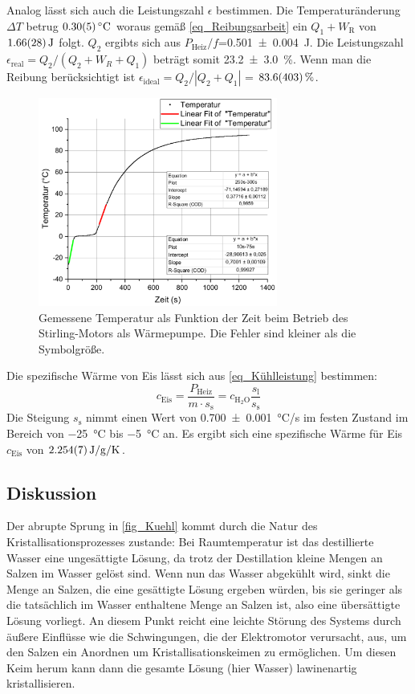 \documentclass[
	a4paper,
	12pt,
	pagesize,
	ngerman
]{scrartcl}
\begin{document}
	Analog lässt sich auch die Leistungszahl $\epsilon$ bestimmen. 
	Die Temperaturänderung $\Delta{T}$ betrug $\SI{0,3+-0,05}{\degreeCelsius}$ woraus gemäß \cref{eq_Reibungsarbeit} ein $Q_1+W_\text{R}$ von $\SI{1,66+-0,28}{J}$ folgt. 
	$Q_2$ ergibts sich aus $P_\text{Heiz}/f$=\SI{0,501+-0,004}{J}.
	Die Leistungszahl $\epsilon_\text{real}=Q_2/(Q_2+W_R+Q_1)$ beträgt somit \SI{23,2+-3,0}{\%}.
	Wenn man die Reibung berücksichtigt ist $\epsilon_\text{ideal}=Q_2/|Q_2+Q_1|$ = $\SI{83,6+-40,3}{\%}$.
	\begin{figure}[H]
		\includegraphics[width=0.7\textwidth]{Waerm}
		\centering
		\caption{Gemessene Temperatur als Funktion der Zeit beim Betrieb des Stirling-Motors als Wärmepumpe. Die Fehler sind kleiner als die Symbolgröße.}
		\label{fig_Waerm}
		\centering
	\end{figure}

	Die spezifische Wärme von Eis lässt sich aus \cref{eq_Kühlleistung} bestimmen:
	\begin{equation}
		c_\text{Eis} = \frac{P_\text{Heiz}}{m \cdot s_\text{s}} = c_{\text{H}_2\text{O}} \frac{s_\text{l}}{s_\text{s}}
	\end{equation} 
	Die Steigung $s_\text{s}$ nimmt einen Wert von \SI{0,700+-0,001}{\degreeCelsius/s} im festen Zustand im Bereich von \SI{-25}{\degreeCelsius} bis \SI{-5}{\degreeCelsius} an.
	Es ergibt sich eine spezifische Wärme für Eis $c_\text{Eis}$ von $\SI{2,254+-0,007}{J/g/K}$.
	\subsection{Diskussion}
	
	Der abrupte Sprung in \cref{fig_Kuehl} kommt durch die Natur des Kristallisationsprozesses zustande:
	Bei Raumtemperatur ist das destillierte Wasser eine ungesättigte Lösung, da trotz der Destillation kleine Mengen an Salzen im Wasser gelöst sind.
	Wenn nun das Wasser abgekühlt wird, sinkt die Menge an Salzen, die eine gesättigte Lösung ergeben würden, bis sie geringer als die tatsächlich im Wasser enthaltene Menge an Salzen ist, also eine übersättigte Lösung vorliegt.
	An diesem Punkt reicht eine leichte Störung des Systems durch äußere Einflüsse wie die Schwingungen, die der Elektromotor verursacht, aus, um den Salzen ein Anordnen um Kristallisationskeimen zu ermöglichen.
	Um diesen Keim herum kann dann die gesamte Lösung (hier Wasser) lawinenartig kristallisieren.
	
\end{document}
